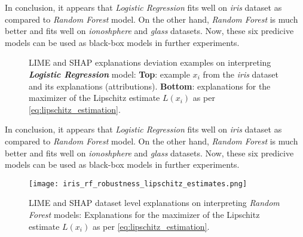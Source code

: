 \documentclass[english]{tktltiki2}
\theoremstyle{definition}
\theoremstyle{remark}
\begin{document}
In conclusion, it appears that \textit{Logistic Regression} fits well on \textit{iris} dataset as compared to \textit{Random Forest} model. On the other hand, \textit{Random Forest} is much better and fits well on \textit{ionoshphere} and \textit{glass} datasets. Now, these six predicive models can be used as black-box models in further experiments.

\begin{figure}[H]
	\vspace*{-5mm}
	\centering
	\qquad
	\caption{{LIME and SHAP explanations deviation examples on interpreting \textbf{\textit{Logistic Regression}} model: \textbf{Top}: example $x_i$ from the \textit{iris} dataset and its explanations (attributions). \textbf{Bottom}: explanations for the maximizer of the Lipschitz estimate $L(x_i)$ as per \eqref{eq:lipschitz_estimation}.}}%
	\label{fig:iris_lr_deviation_stability}%
\end{figure}


In conclusion, it appears that \textit{Logistic Regression} fits well on \textit{iris} dataset as compared to \textit{Random Forest} model. On the other hand, \textit{Random Forest} is much better and fits well on \textit{ionoshphere} and \textit{glass} datasets. Now, these six predicive models can be used as black-box models in further experiments.

\begin{figure}[H]
	\centering
	\texttt{[image: iris\_rf\_robustness\_lipschitz\_estimates.png]}
	\vspace*{-10mm}
	\caption{LIME and SHAP dataset level explanations on interpreting \textit{Random Forest} models: Explanations for the maximizer of the Lipschitz estimate $L(x_i)$ as per \eqref{eq:lipschitz_estimation}.}
	\label{fig:iris_rf_robustness_lipschitz_estimates}
\end{figure} 
\end{document}
